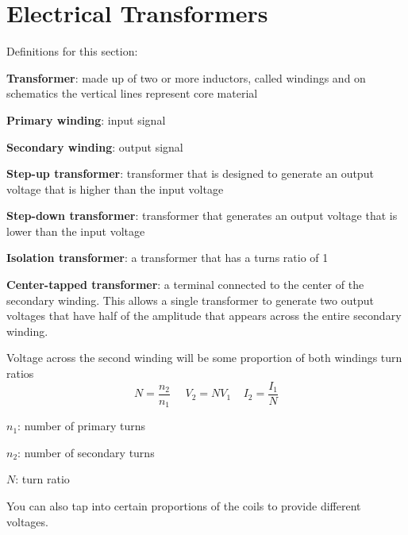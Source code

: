 \section{Electrical Transformers}
Definitions for this section:
\begin{pline}
    \item \textbf{Transformer}: made up of two or more inductors, called windings and on schematics the vertical lines represent core material
    \item \textbf{Primary winding}: input signal
    \item \textbf{Secondary winding}: output signal
    \item \textbf{Step-up transformer}: transformer that is designed to generate an output voltage that is higher than the input voltage
    \item \textbf{Step-down transformer}: transformer that generates an output voltage that is lower than the input voltage
    \item \textbf{Isolation transformer}: a transformer that has a turns ratio of 1
    \item \textbf{Center-tapped transformer}: a terminal connected to the center of the secondary winding. This allows a single transformer to generate two output voltages that have half of the amplitude that appears across the entire secondary winding. 
\end{pline}

Voltage across the second winding will be some proportion of both windings turn ratios
    \[N = \frac{n_2}{n_1} ~~~~~~ V_2 = NV_1 ~~~~~ I_2 = \frac{I_1}{N}\]
\begin{gline}
    \item $n_1$: number of primary turns
    \item $n_2$: number of secondary turns
    \item $N$: turn ratio
\end{gline}



You can also tap into certain proportions of the coils to provide different voltages.



